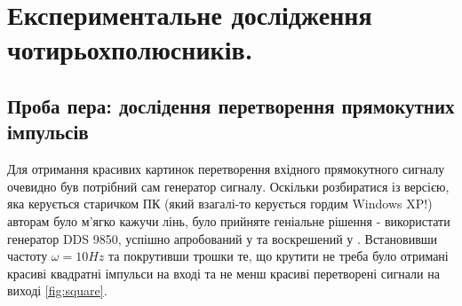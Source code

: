 \chapter{Експериментальне дослідження чотирьохполюсників.} 
\label{chapter:first}

\section{Проба пера: дослідення перетворення прямокутних імпульсів}

Для отримання красивих картинок перетворення вхідного прямокутного сигналу очевидно був потрібний сам генератор сигналу. Оскільки розбиратися із версією, яка керується старичком ПК (який взагалі-то керується гордим Windows XP!) авторам було м'ягко кажучи лінь, було прийняте геніальне рішення - використати генератор DDS 9850, успішно апробований у \cite{lab3} та воскрешений у \cite{lab1}. Встановивши частоту $\omega = 10Hz$ та покрутивши трошки те, що крутити не треба було отримані красиві квадратні імпульси на вході та не менш красиві перетворені сигнали на виході \ref{fig:square}.

